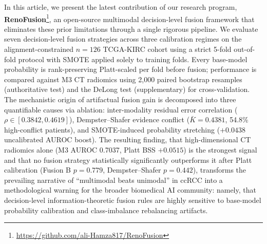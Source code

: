 In this article, we present the latest contribution of our research program, \textbf{RenoFusion}\footnote{\url{https://github.com/ali-Hamza817/RenoFusion}}, an open-source multimodal decision-level fusion framework that eliminates these prior limitations through a single rigorous pipeline. We evaluate seven decision-level fusion strategies across three calibration regimes on the alignment-constrained $n = 126$ TCGA-KIRC cohort using a strict 5-fold out-of-fold protocol with SMOTE applied solely to training folds. Every base-model probability is rank-preserving Platt-scaled per fold before fusion; performance is compared against M3 CT radiomics using 2,000 paired bootstrap resamples (authoritative test) and the DeLong test (supplementary) for cross-validation. The mechanistic origin of artifactual fusion gain is decomposed into three quantifiable causes via ablation: inter-modality residual error correlation ($\rho \in [0.3842, 0.4619]$), Dempster--Shafer evidence conflict ($\bar{K} = 0.4381$, 54.8\% high-conflict patients), and SMOTE-induced probability stretching ($+0.0438$ uncalibrated AUROC boost). The resulting finding, that high-dimensional CT radiomics alone (M3 AUROC 0.7037, Platt BSS $+0.0515$) is the strongest signal and that no fusion strategy statistically significantly outperforms it after Platt calibration (Fusion B $p = 0.779$, Dempster--Shafer $p = 0.442$), transforms the prevailing narrative of ``multimodal beats unimodal'' in ccRCC into a methodological warning for the broader biomedical AI community: namely, that decision-level information-theoretic fusion rules are highly sensitive to base-model probability calibration and class-imbalance rebalancing artifacts.

